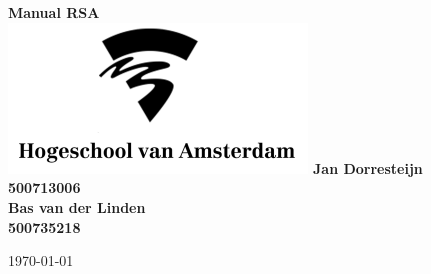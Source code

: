 \begin{titlepage}
  \centering
    \vfill
    {\bfseries\Huge
      Manual RSA\\
        \vskip2cm
      }
    \includegraphics[height=4cm]{images/hva-logo-png-7.png} %
    \vfill
      {\bfseries\Large
      Jan Dorresteijn  \\
      }
      {
        \bfseries\normalsize
        500713006\\
        \vskip1cm
        }
      {\bfseries\Large
        Bas van der Linden \\
      }
      {
        \bfseries\normalsize
        500735218\\
        \vskip1cm
    }    
    \vfill

    \today\\

\end{titlepage}
\newpage
